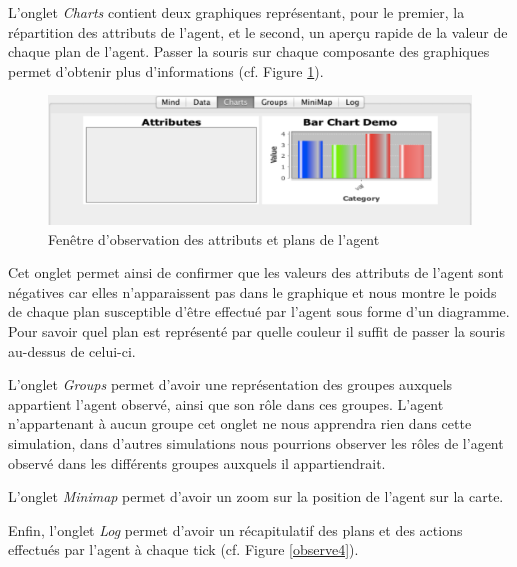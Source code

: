 L'onglet \textit{Charts} contient deux graphiques représentant, pour le premier, la répartition des attributs de l'agent, et le second, un aperçu rapide de la valeur de chaque plan de l'agent. Passer la souris sur chaque composante des graphiques permet d'obtenir plus d'informations (cf. Figure \ref{observe3}).

\begin{figure}[!ht]
\begin{center}
\includegraphics[scale=0.5]{DocumentationSimulation/observe3.pdf}
\caption[observe]{Fenêtre d'observation des attributs et plans de l'agent \\}
\label{observe3}
\end{center}
\end{figure} 

Cet onglet permet ainsi de confirmer que les valeurs des attributs de l'agent sont négatives car elles n'apparaissent pas dans le graphique et nous montre le poids de chaque plan susceptible d'être effectué par l'agent sous forme d'un diagramme. Pour savoir quel plan est représenté par quelle couleur il suffit de passer la souris au-dessus de celui-ci.



L'onglet \textit{Groups} permet d'avoir une représentation des groupes auxquels appartient l'agent observé, ainsi que son rôle dans ces groupes. L'agent n'appartenant à aucun groupe cet onglet ne nous apprendra rien dans cette simulation, dans d'autres simulations nous pourrions observer les rôles de l'agent observé dans les différents groupes auxquels il appartiendrait.



L'onglet \textit{Minimap} permet d'avoir un zoom sur la position de l'agent sur la carte.



Enfin, l'onglet \textit{Log }permet d'avoir un récapitulatif des plans et des actions effectués par l'agent à chaque tick (cf. Figure \ref{observe4}).

